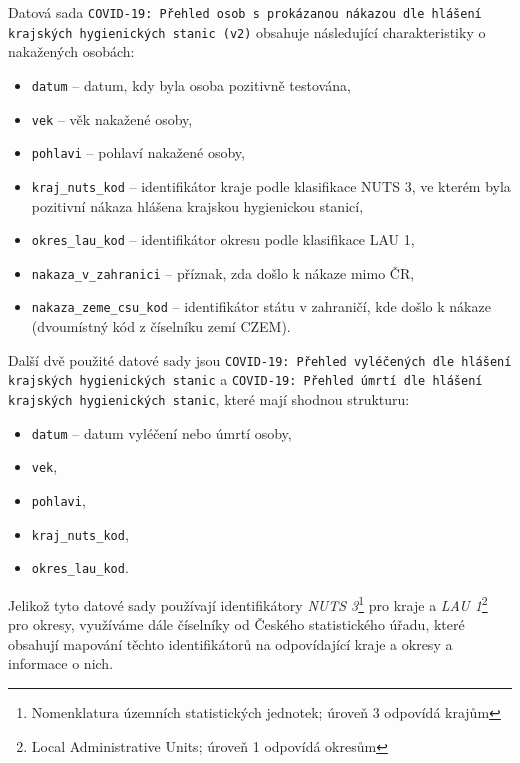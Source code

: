 \documentclass[11pt,a4paper,titlepage]{article}
\begin{document}
Datová sada \texttt{COVID-19: Přehled osob s prokázanou nákazou dle hlášení krajských hy\-gi\-e\-nic\-kých stanic (v2)} obsahuje následující charakteristiky o nakažených osobách:
\begin{itemize}
    \setlength\itemsep{0.3em}
    \item \texttt{datum} -- datum, kdy byla osoba pozitivně testována,
    \item \texttt{vek} -- věk nakažené osoby,
    \item \texttt{pohlavi} -- pohlaví nakažené osoby,
    \item \texttt{kraj\_nuts\_kod} -- identifikátor kraje podle klasifikace NUTS 3, ve kterém byla pozitivní nákaza hlášena krajskou hygienickou stanicí,
    \item \texttt{okres\_lau\_kod} -- identifikátor okresu podle klasifikace LAU 1,
    \item \texttt{nakaza\_v\_zahranici} -- příznak, zda došlo k nákaze mimo ČR,
    \item \texttt{nakaza\_zeme\_csu\_kod} -- identifikátor státu v zahraničí, kde došlo k nákaze (dvoumístný kód z číselníku zemí CZEM).
\end{itemize}

Další dvě použité datové sady jsou \texttt{COVID-19: Přehled vyléčených dle hlášení krajských hy\-gi\-e\-nických stanic} a \texttt{COVID-19: Přehled úmrtí dle hlášení krajských hygienických stanic}, které mají shodnou strukturu:
\begin{itemize}
    \setlength\itemsep{0.3em}
    \item \texttt{datum} -- datum vyléčení nebo úmrtí osoby,
    \item \texttt{vek},
    \item \texttt{pohlavi},
    \item \texttt{kraj\_nuts\_kod},
    \item \texttt{okres\_lau\_kod}.
\end{itemize}

Jelikož tyto datové sady používají identifikátory \textit{NUTS 3}\footnote{Nomenklatura územních statistických jednotek; úroveň 3 odpovídá krajům} pro kraje a \textit{LAU 1}\footnote{Local Administrative Units; úroveň 1 odpovídá okresům} pro okresy, využíváme dále číselníky od Českého statistického úřadu, které obsahují mapování těchto identifikátorů na odpovídající kraje a okresy a informace o nich.
\end{document}
